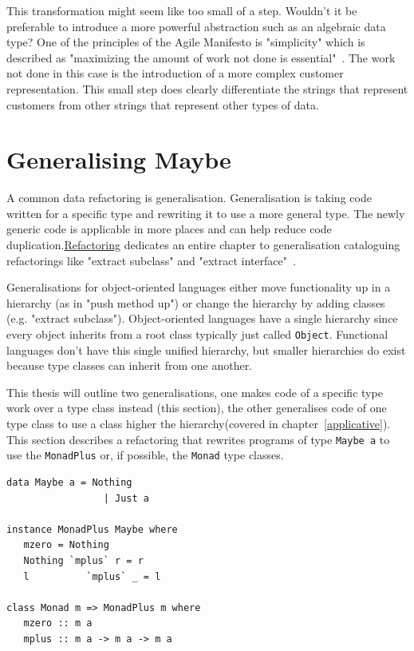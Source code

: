  This transformation might seem like too small of a step. Wouldn't it be preferable to introduce a more powerful abstraction such as an algebraic data type? One of the principles of the Agile Manifesto is "simplicity" which is described as "maximizing the amount of work not done is essential"~\cite{agileManifesto}. The work not done in this case is the introduction of a more complex customer representation. This small step does clearly differentiate the strings that represent customers from other strings that represent other types of data.


\section{Generalising Maybe}
 
A common data refactoring is generalisation. Generalisation is taking code written for a specific type and rewriting it to use a more general type. The newly generic code is applicable in more places and can help reduce code duplication.\underline{Refactoring} dedicates an entire chapter to generalisation cataloguing refactorings like "extract subclass" and "extract interface"~\citep[pg. 319]{fowler}. 

Generalisations for object-oriented languages either move functionality up in a hierarchy (as in "push method up") or change the hierarchy by adding classes (e.g. "extract subclass"). Object-oriented languages have a single hierarchy since every object inherits from a root class typically just called \texttt{Object}. Functional languages don't have this single unified hierarchy, but smaller hierarchies do exist because type classes can inherit from one another. 

This thesis will outline two generalisations, one makes code of a specific type work over a type class instead (this section), the other generalises code of one type class to use a class higher the hierarchy(covered in chapter~\ref{applicative}). This section describes a refactoring that rewrites programs of type \texttt{Maybe a} to use the \texttt{MonadPlus} or, if possible, the \texttt{Monad} type classes. 

\begin{lstlisting}[caption={The \texttt{Maybe} data type definition and \texttt{MonadPlus} instance declaration, and the \texttt{MonadPlus} class definition.},label=maybeMonadPlus]
data Maybe a = Nothing
                 | Just a
                 
instance MonadPlus Maybe where
   mzero = Nothing
   Nothing `mplus` r = r
   l          `mplus` _ = l
                 
class Monad m => MonadPlus m where
   mzero :: m a
   mplus :: m a -> m a -> m a
\end{lstlisting}
 
